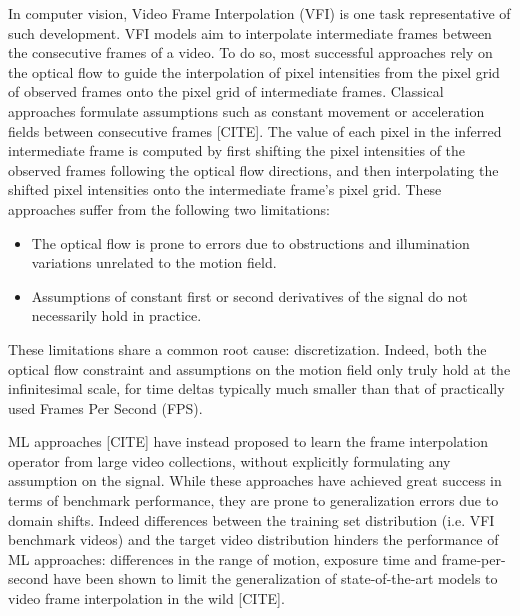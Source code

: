 \documentclass{article}
\begin{document}
In computer vision, Video Frame Interpolation (VFI) is one task representative of such development.
VFI models aim to interpolate intermediate frames between the consecutive frames of a video.
To do so, most successful approaches rely on the optical flow
to guide the interpolation of pixel intensities from the pixel grid of observed frames onto the pixel grid of intermediate frames.
Classical approaches formulate assumptions such as constant movement or acceleration fields between consecutive frames [CITE].
The value of each pixel in the inferred intermediate frame is computed by first shifting the pixel intensities of the observed frames following the
optical flow directions, and then interpolating the shifted pixel intensities onto the intermediate frame's pixel grid.
These approaches suffer from the following two limitations:

\begin{itemize}
\item The optical flow is prone to errors due to obstructions and illumination variations unrelated to the motion field.
\item Assumptions of constant first or second derivatives of the signal do not necessarily hold in practice.
\end{itemize}

These limitations share a common root cause: discretization.
Indeed, both the optical flow constraint and assumptions on the motion field only truly hold at the infinitesimal scale,
for time deltas typically much smaller than that of practically used Frames Per Second (FPS).

ML approaches [CITE] have instead proposed to learn the frame interpolation operator from large video collections,
without explicitly formulating any assumption on the signal.
While these approaches have achieved great success in terms of benchmark performance,
they are prone to generalization errors due to domain shifts. %
Indeed differences between the training set distribution (i.e. VFI benchmark videos) and the target video distribution hinders the performance of ML approaches:
differences in the range of motion, exposure time and frame-per-second have been shown to limit the
generalization of state-of-the-art models to video frame interpolation in the wild [CITE]. %
\end{document}
